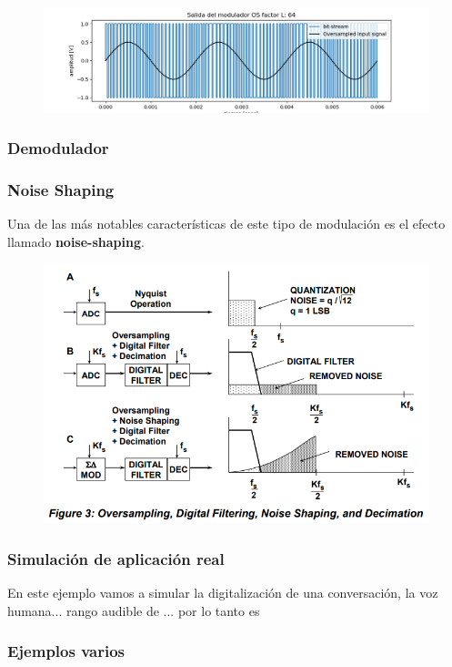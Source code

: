 \begin{figure}[H]
	\centering
	\includegraphics[width=0.7\linewidth]{ImagenesEjercicio2/BitsStream64}
	\caption{}
	\label{fig:bitsstream64}
\end{figure}







\subsubsection{Demodulador}

\subsubsection{Noise Shaping}
Una de las más notables características de este tipo de modulación es el efecto llamado \textbf{noise-shaping}.

\begin{figure}[H]
	\centering
	\includegraphics[width=0.7\linewidth]{ImagenesEjercicio2/NoiseShappingAN}
	\caption{}
	\label{fig:noiseshappingan}
\end{figure}


\subsubsection{Simulación de aplicación real}
En este ejemplo vamos a simular la digitalización de una conversación, la voz humana... rango audible de ... por lo tanto es 

\subsubsection{Ejemplos varios}

